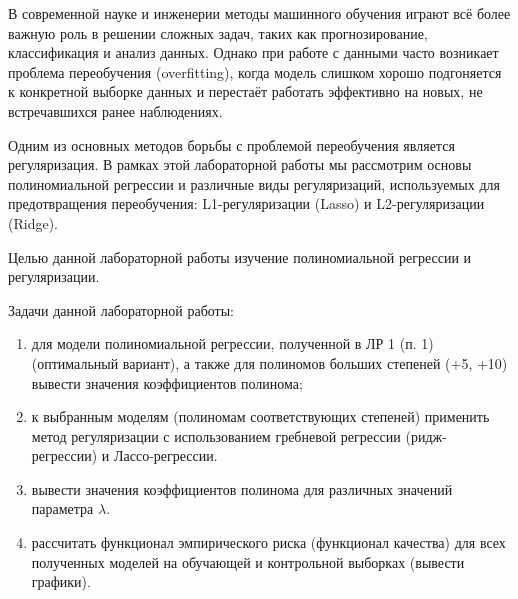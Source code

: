 
В современной науке и инженерии методы машинного обучения играют всё более важную роль в решении сложных задач, таких как прогнозирование, классификация и анализ данных. Однако при 
работе с данными часто возникает проблема переобучения (overfitting), когда модель слишком хорошо подгоняется к конкретной выборке данных и перестаёт работать эффективно на новых, 
не встречавшихся ранее наблюдениях.

Одним из основных методов борьбы с проблемой переобучения является регуляризация. В рамках этой лабораторной работы мы рассмотрим основы полиномиальной регрессии и различные виды 
регуляризаций, используемых для предотвращения переобучения: L1-регуляризации (Lasso) и L2-регуляризации (Ridge).

Целью данной лабораторной работы изучение полиномиальной регрессии и регуляризации.

Задачи данной лабораторной работы:
\begin{enumerate}[label*=\arabic*)]
	\item для модели полиномиальной регрессии, полученной в ЛР 1 (п. 1) (оптимальный вариант), а также для полиномов больших  степеней (+5, +10) вывести значения коэффициентов полинома;
	\item к выбранным моделям (полиномам соответствующих степеней) применить метод регуляризации с использованием гребневой регрессии (ридж-регрессии) и Лассо-регрессии. 
	\item вывести значения коэффициентов полинома для различных значений параметра $\lambda$. 
	\item рассчитать функционал эмпирического риска (функционал качества) для всех полученных моделей на обучающей и контрольной выборках (вывести графики).
\end{enumerate}

\clearpage

